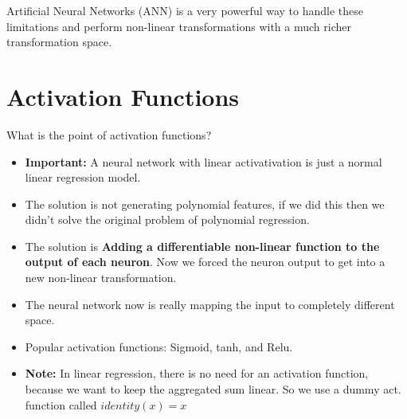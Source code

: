 \documentclass[20pt]{article}
\begin{document}
Artificial Neural Networks (ANN) is a very powerful way to handle these limitations and perform non-linear transformations with a much richer transformation space.

\section{Activation Functions}
What is the point of activation functions?
\begin{itemize}
    \item \textbf{Important: } A neural network with linear activativation is just a normal linear regression model.
    \item The solution is not generating polynomial features, if we did this then we didn't solve the original problem of polynomial regression.
    \item The solution is \textbf{Adding a differentiable non-linear function to the output of each neuron}. Now we forced the neuron output to get into a new non-linear transformation.
    \item The neural network now is really mapping the input to completely different space.
    \item Popular activation functions: Sigmoid, tanh, and Relu.
    \item \textbf{Note: } In linear regression, there is no need for an activation function, because we want to keep the aggregated sum linear. So we use a dummy act. function called $identity(x) = x$
\end{itemize}
\end{document}
